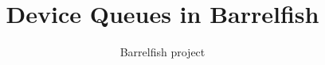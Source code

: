 \documentclass[a4paper,11pt,twoside]{report}
\title{Device Queues in Barrelfish}
\author{Barrelfish project}
\begin{document}
	\maketitle			%
	
	\begin{versionhistory}
	\end{versionhistory}
	
	\tableofcontents		%
	\cleardoublepage
	\setcounter{secnumdepth}{2}
	
	\newcommand{\fnname}[1]{\textit{\texttt{#1}}}%
	\newcommand{\datatype}[1]{\textit{\texttt{#1}}}%
	\newcommand{\varname}[1]{\texttt{#1}}%
	\newcommand{\keywname}[1]{\textbf{\texttt{#1}}}%
	\newcommand{\pathname}[1]{\texttt{#1}}%
	\newcommand{\tabindent}{\hspace*{3ex}}%
\end{document}
